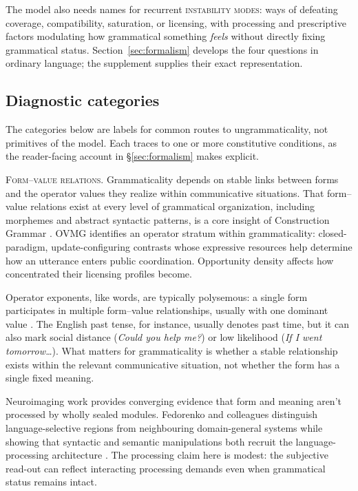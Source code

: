 \documentclass[12pt,letterpaper]{article}
\newcommand{\term}[1]{\textsc{#1}}
\newcommand{\mention}[1]{\textit{#1}}
\begin{document}
The model also needs names for recurrent \term{instability modes}: ways of
defeating coverage, compatibility, saturation, or licensing, with processing and
prescriptive factors modulating how grammatical something \emph{feels} without
directly fixing grammatical status. Section~\ref{sec:formalism} develops the
four questions in ordinary language; the supplement supplies their exact
representation.

\subsection{Diagnostic categories}\label{sec:core-components}

The categories below are labels for common routes to ungrammaticality, not
primitives of the model. Each traces to one or more constitutive conditions, as
the reader-facing account in \S\ref{sec:formalism} makes explicit.

\noindent\textsc{Form--value relations.} Grammaticality depends on stable links between forms and the operator values they realize within communicative situations. That form--value relations exist at every level of grammatical organization, including morphemes and abstract syntactic patterns, is a core insight of Construction Grammar \autocite{goldberg1995constructions}. OVMG identifies an operator stratum within grammaticality: closed-paradigm, update-configuring contrasts whose expressive resources help determine how an utterance enters public coordination. Opportunity density affects how concentrated their licensing profiles become.

Operator exponents, like words, are typically polysemous: a single form participates in multiple form--value relationships, usually with one dominant value \autocite{Kilgarriff2004}. The English past tense, for instance, usually denotes past time, but it can also mark social distance (\mention{Could you help me?}) or low likelihood (\mention{If I went tomorrow\dots}). What matters for grammaticality is whether a stable relationship exists within the relevant communicative situation, not whether the form has a single fixed meaning.

Neuroimaging work provides converging evidence that form and meaning aren't processed by wholly sealed modules. Fedorenko and colleagues distinguish language-selective regions from neighbouring domain-general systems while showing that syntactic and semantic manipulations both recruit the language-processing architecture \autocite{Fedorenko2011, Fedorenko2012, Fedorenko2024}. The processing claim here is modest: the subjective read-out can reflect interacting processing demands even when grammatical status remains intact.
\end{document}
